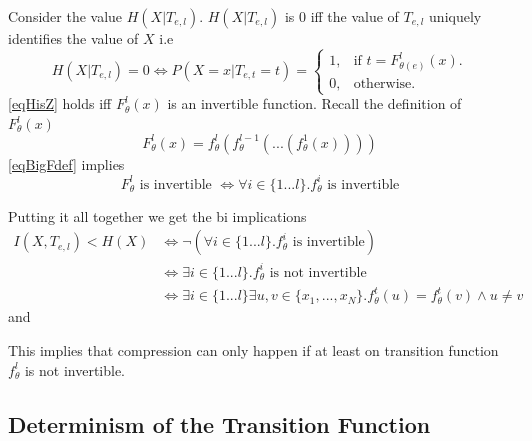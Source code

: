 \documentclass[dissertation.tex]{subfiles}
\begin{document}
Consider the value $H(X|T_{e,l})$. $H(X|T_{e,l})$ is 0 iff the value of
$T_{e,l}$ uniquely identifies the value of $X$ i.e
\begin{equation} 
  H(X|T_{e,l}) = 0
  \Leftrightarrow 
  P(X=x|T_{e,t}=t) = \begin{cases}
    1, & \text{if } t = F_{\theta(e)}^l(x). \\
    0, & \text{otherwise}.
  \end{cases}
  \label{eqHisZ}
\end{equation}
\autoref{eqHisZ} holds iff $F_{\theta}^l(x)$ is an invertible function.
Recall the definition of $F_{\theta}^l(x)$
\begin{equation}
  F_{\theta}^l(x) = f_{\theta}^l(f_{\theta}^{l-1}(...(f_{\theta}^1(x))))
  \label{eqBigFdef}
\end{equation}
\autoref{eqBigFdef} implies 
\begin{equation*}
  F_\theta^l \text{ is invertible } 
  \Leftrightarrow 
  \forall{i}\in{\{1...l\}}. f_\theta^i \text{ is invertible} 
\end{equation*}

Putting it all together we get the bi implications
\begin{align}
  I(X, T_{e,l}) < H(X) 
  &\Leftrightarrow 
  \neg(\forall{i}\in{\{1...l\}}. f_\theta^i \text{ is invertible})
  \nonumber\\
  &\Leftrightarrow 
  \exists{i}\in{\{1...l\}}. f_\theta^i \text{ is not invertible} 
  \nonumber\\
  &\Leftrightarrow 
  \exists{i}\in{\{1...l\}}\exists{u,v}\in{\{x_1,...,x_N\}}.
  f_\theta^t(u)=f_\theta^t(v) \land u \neq v 
\end{align}
and 

This implies that compression can only happen if at least on transition
function $f_\theta^l$ is not invertible.

\subsection{Determinism of the Transition Function} \label{subDTF}
\end{document}
